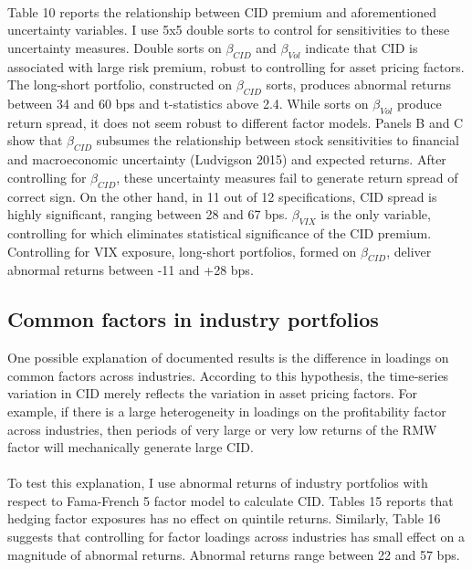 \documentclass[12pt]{article}
\begin{document}
\paragraph{}
Table 10 reports the relationship between CID premium and aforementioned uncertainty variables. I use 5x5 double sorts to control for sensitivities to these uncertainty measures. Double sorts on $\beta_{CID}$ and $\beta_{Vol}$ indicate that CID is associated with large risk premium, robust to controlling for asset pricing factors. The long-short portfolio, constructed on $\beta_{CID}$ sorts, produces abnormal returns between 34 and 60 bps and t-statistics above 2.4. While sorts on $\beta_{Vol}$ produce return spread, it does not seem robust to different factor models. Panels B and C show that $\beta_{CID}$ subsumes the relationship between stock sensitivities to financial and macroeconomic uncertainty (Ludvigson 2015) and expected returns. After controlling for $\beta_{CID}$, these uncertainty measures fail to generate return spread of correct sign. On the other hand, in 11 out of 12 specifications, CID spread is highly significant, ranging between 28 and 67 bps.
$\beta_{VIX}$ is the only variable, controlling for which eliminates statistical significance of the CID premium. Controlling for VIX exposure, long-short portfolios, formed on $\beta_{CID}$, deliver abnormal returns between -11 and +28 bps. 


\subsection{Common factors in industry portfolios}

One possible explanation of documented results is the difference in loadings on common factors across industries. According to this hypothesis, the time-series variation in CID merely reflects the variation in asset pricing factors. For example, if there is a large heterogeneity in loadings on the profitability factor across industries, then periods of very large or very low returns of the RMW factor will mechanically generate large CID.
\paragraph{}
To test this explanation, I use abnormal returns of industry portfolios with respect to Fama-French 5 factor model to calculate CID. Tables 15 reports that hedging factor exposures has no effect on quintile returns. Similarly, Table 16 suggests that controlling for factor loadings across industries has small effect on a magnitude of abnormal returns. Abnormal returns range between 22 and 57 bps. 
\end{document}
